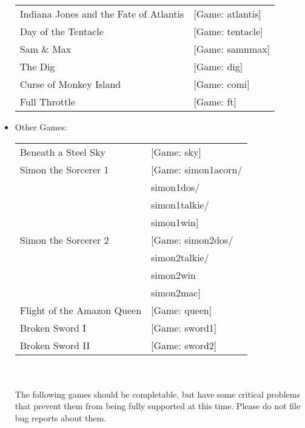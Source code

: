 \begin{itemize}
\begin {tabular} [h] {ll}
    Indiana Jones and the Fate of Atlantis&          [Game: atlantis]\\
    Day of the Tentacle&                             [Game: tentacle]\\
    Sam \& Max&                                       [Game: samnmax]\\
    The Dig&                                        [Game: dig]\\
    Curse of Monkey Island&                          [Game: comi]\\
    Full Throttle&                                 [Game: ft]\\
  \end{tabular}
\item Other Games:\\ 
  \begin{tabular}[h]{ll}
     Beneath a Steel Sky&                             [Game: sky]\\
     Simon the Sorcerer 1&                            [Game: simon1acorn/\\
     &                                                       simon1dos/\\
     &                                                       simon1talkie/\\
     &                                                       simon1win]\\
     Simon the Sorcerer 2&                            [Game: simon2dos/\\
     &                                                       simon2talkie/\\
     &                                                       simon2win\\
     &                                                       simon2mac]\\
    Flight of the Amazon Queen&                    [Game: queen]\\
    Broken Sword I&                                [Game: sword1]\\
    Broken Sword II&                               [Game: sword2]\\
  \end{tabular}\\
\quad \\
  The following games should be completable, but have some critical problems that prevent them from being fully supported at this time. Please do not file bug reports about them.\\


\end{itemize}
